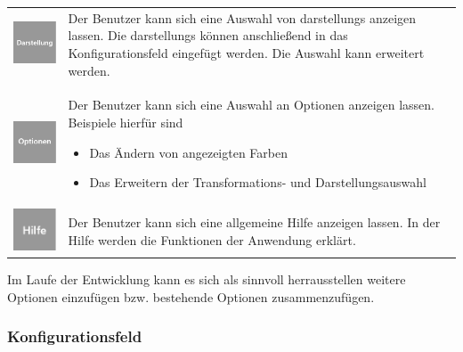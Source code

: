 \documentclass[parskip=full]{scrartcl}
\begin{document}
\begin{tabular}[t]{p{1cm} p{10cm}}
	\vspace{0cm}\includegraphics[width = 1 cm]{Grafik/Darstellung.png} & Der Benutzer kann sich eine Auswahl von \glspl{darstellung} anzeigen lassen. Die \glspl{darstellung} können anschließend in das Konfigurationsfeld eingefügt werden. Die Auswahl kann erweitert werden.\newline\\
	\vspace{0cm}\includegraphics[width = 1 cm]{Grafik/Optionen.png} & Der Benutzer kann sich eine Auswahl an Optionen anzeigen lassen. Beispiele hierfür sind
	\begin{itemize} 
		\item Das Ändern von angezeigten Farben
		\item Das Erweitern der Transformations- und Darstellungsauswahl
	\end{itemize}\\
	\vspace{0cm}\includegraphics[width = 1 cm]{Grafik/Hilfe.png} & Der Benutzer kann sich eine allgemeine Hilfe anzeigen lassen. In der Hilfe werden die Funktionen der Anwendung erklärt.\newline\\
\end{tabular}

Im Laufe der Entwicklung kann es sich als sinnvoll herrausstellen weitere Optionen einzufügen bzw. bestehende Optionen zusammenzufügen.

\subsubsection{Konfigurationsfeld}
\end{document}
